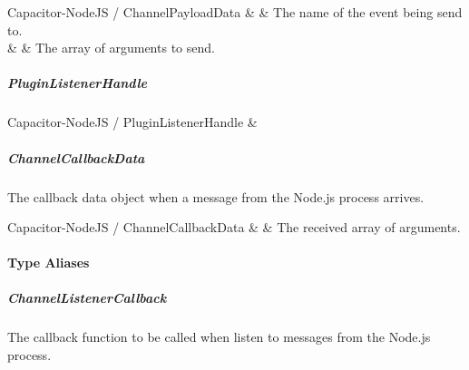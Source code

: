 \begin{interfacedesc}{Capacitor-NodeJS / ChannelPayloadData}
   &  & The name of the event being send to. \\ \hline
        &   & The array of arguments to send. \\ \hline
\end{interfacedesc}   


\subparagraph{PluginListenerHandle}

\begin{interface}{Capacitor-NodeJS / PluginListenerHandle}
   &  \\ \hline
\end{interface}


\subparagraph{ChannelCallbackData}

The callback data object when a message from the Node.js process arrives.

\begin{interfacedesc}{Capacitor-NodeJS / ChannelCallbackData}
   &  & The received array of arguments. \\ \hline
\end{interfacedesc}


\paragraph{Type Aliases}


\subparagraph{ChannelListenerCallback}

The callback function to be called when listen to messages from the Node.js process.

